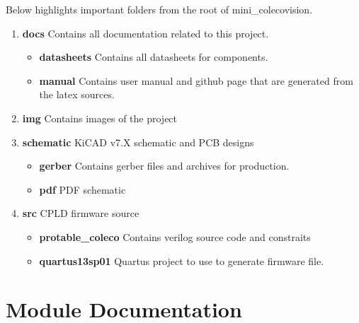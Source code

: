 \par
Below highlights important folders from the root of mini\_colecovision.

\begin{enumerate}
  \item \textbf{docs} Contains all documentation related to this project.
    \begin{itemize}
      \item \textbf{datasheets} Contains all datasheets for components.
      \item \textbf{manual} Contains user manual and github page that are generated from the latex sources.
    \end{itemize}
  \item \textbf{img} Contains images of the project
  \item \textbf{schematic} KiCAD v7.X schematic and PCB designs
    \begin{itemize}
      \item \textbf{gerber} Contains gerber files and archives for production.
      \item \textbf{pdf} PDF schematic
    \end{itemize}
  \item \textbf{src} CPLD firmware source
    \begin{itemize}
      \item \textbf{protable\_coleco} Contains verilog source code and constraits
      \item \textbf{quartus13sp01} Quartus project to use to generate firmware file.
    \end{itemize}
\end{enumerate}

\section{Module Documentation}
